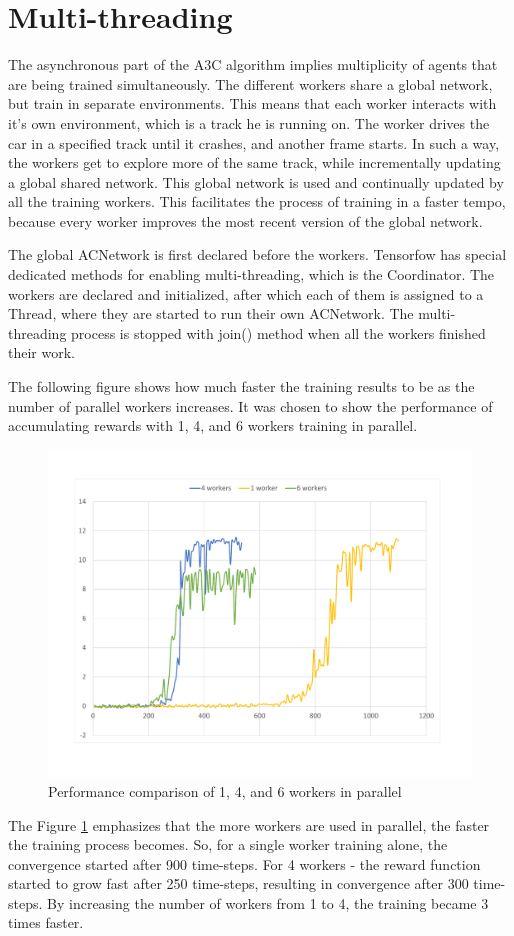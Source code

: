 \section{Multi-threading}\label{Multi-threading}
The asynchronous part of the A3C algorithm implies multiplicity of agents that are being trained simultaneously. The different workers share a global network, but train in separate environments. This means that each worker interacts with it's own environment, which is a track he is running on. The worker drives the car in a specified track until it crashes, and another frame starts. In such a way, the workers get to explore more of the same track, while incrementally updating a global shared network. This global network is used and continually updated by all the training workers. This facilitates the process of training in a faster tempo, because every worker improves the most recent version of the global network.

The global ACNetwork is first declared before the workers. Tensorfow has special dedicated methods for enabling multi-threading, which is the Coordinator. The workers are declared and initialized, after which each of them is assigned to a Thread, where they are started to run their own ACNetwork. The multi-threading process is stopped with join() method when all the workers finished their work.

The following figure shows how much faster the training results to be as the number of parallel workers increases. It was chosen to show the performance of accumulating rewards with 1, 4, and  6 workers training in parallel.
\begin{figure}[H]
	\centering
	\includegraphics[width=\textwidth]{Figures/Workers}
	\caption{Performance comparison of 1, 4, and 6 workers in parallel}
	\label{fig:Workers}
\end{figure}
 The Figure \ref{fig:Workers} emphasizes that the more workers are used in parallel, the faster the training process becomes. So, for a single worker training alone, the convergence started after 900 time-steps. For 4 workers - the reward function started to grow fast after 250 time-steps, resulting in convergence after 300 time-steps. By increasing the number of workers from 1 to 4, the training became 3 times faster.
 
